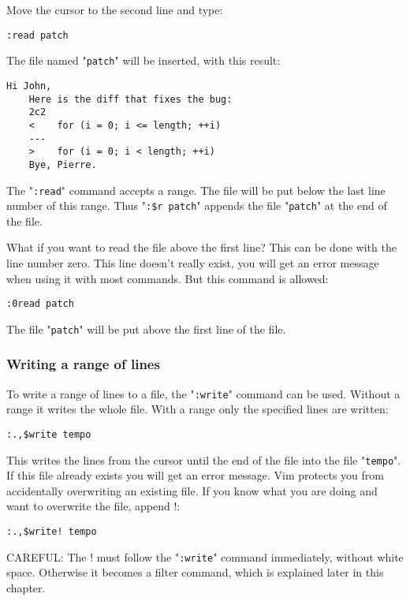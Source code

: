 Move the cursor to the second line and type:

\begin{Verbatim}[samepage=true]
 :read patch
\end{Verbatim}

The file named "\verb!patch!" will be inserted, with this result:

\begin{Verbatim}[samepage=true]
    Hi John, 
    Here is the diff that fixes the bug: 
    2c2 
    <    for (i = 0; i <= length; ++i) 
    --- 
    >    for (i = 0; i < length; ++i) 
    Bye, Pierre. 
\end{Verbatim}

The "\verb!:read!" command accepts a range.
The file will be put below the last line number of this range.
Thus "\verb!:$r patch!" appends the file "\verb!patch!" at the end of the file.

What if you want to read the file above the first line?  This can be done with the line number zero.
This line doesn't really exist, you will get an error message when using it with most commands.
But this command is allowed:

\begin{Verbatim}[samepage=true]
 :0read patch
\end{Verbatim}

The file "\verb!patch!" will be put above the first line of the file.
\subsubsection{Writing a range of lines}
To write a range of lines to a file, the "\verb!:write!" command can be used.
Without a range it writes the whole file.
With a range only the specified lines are written:

\begin{Verbatim}[samepage=true]
 :.,$write tempo
\end{Verbatim}

This writes the lines from the cursor until the end of the file into the file "\verb!tempo!".
If this file already exists you will get an error message.
Vim protects you from accidentally overwriting an existing file.
If you know what you are doing and want to overwrite the file, append !:

\begin{Verbatim}[samepage=true]
 :.,$write! tempo
\end{Verbatim}

CAREFUL: The ! must follow the "\verb!:write!" command immediately, without white space.
Otherwise it becomes a filter command, which is explained later in this chapter.
